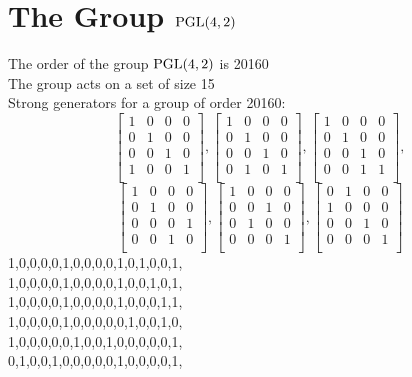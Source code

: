\section*{The Group ${\rm PGL}(4,2)$}
\noindent The order of the group ${\rm PGL}(4,2)$ is 20160\\
\noindent The group acts on a set of size 15\\
Strong generators for a group of order 20160:
$$
\left[
\begin{array}{*{4}{r}}
1 & 0 & 0 & 0\\
0 & 1 & 0 & 0\\
0 & 0 & 1 & 0\\
1 & 0 & 0 & 1\\
\end{array}
\right]
, 
\left[
\begin{array}{*{4}{r}}
1 & 0 & 0 & 0\\
0 & 1 & 0 & 0\\
0 & 0 & 1 & 0\\
0 & 1 & 0 & 1\\
\end{array}
\right]
, 
\left[
\begin{array}{*{4}{r}}
1 & 0 & 0 & 0\\
0 & 1 & 0 & 0\\
0 & 0 & 1 & 0\\
0 & 0 & 1 & 1\\
\end{array}
\right]
, 
$$
$$
\left[
\begin{array}{*{4}{r}}
1 & 0 & 0 & 0\\
0 & 1 & 0 & 0\\
0 & 0 & 0 & 1\\
0 & 0 & 1 & 0\\
\end{array}
\right]
, 
\left[
\begin{array}{*{4}{r}}
1 & 0 & 0 & 0\\
0 & 0 & 1 & 0\\
0 & 1 & 0 & 0\\
0 & 0 & 0 & 1\\
\end{array}
\right]
, 
\left[
\begin{array}{*{4}{r}}
0 & 1 & 0 & 0\\
1 & 0 & 0 & 0\\
0 & 0 & 1 & 0\\
0 & 0 & 0 & 1\\
\end{array}
\right]
$$
1,0,0,0,0,1,0,0,0,0,1,0,1,0,0,1,\\
1,0,0,0,0,1,0,0,0,0,1,0,0,1,0,1,\\
1,0,0,0,0,1,0,0,0,0,1,0,0,0,1,1,\\
1,0,0,0,0,1,0,0,0,0,0,1,0,0,1,0,\\
1,0,0,0,0,0,1,0,0,1,0,0,0,0,0,1,\\
0,1,0,0,1,0,0,0,0,0,1,0,0,0,0,1,\\
